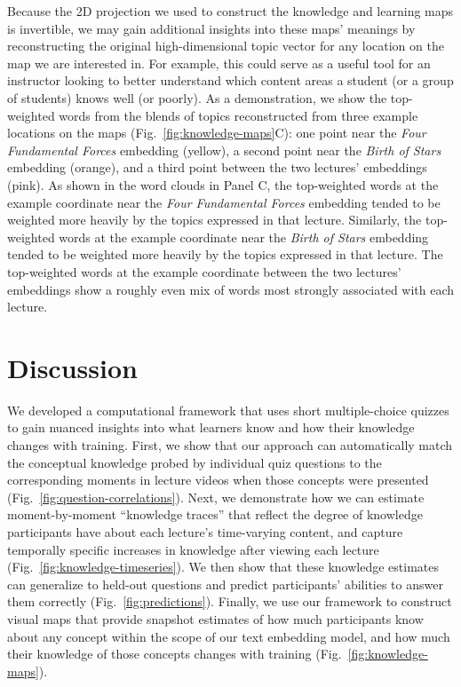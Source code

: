 \documentclass[10pt]{article}
\begin{document}
Because the 2D projection we used to construct the knowledge and learning maps
is invertible, we may gain additional insights into these maps' meanings by
reconstructing the original high-dimensional topic vector for any location on
the map we are interested in. For example, this could serve as a useful tool
for an instructor looking to better understand which content areas a student
(or a group of students) knows well (or poorly). As a demonstration, we show
the top-weighted words from the blends of topics reconstructed from three
example locations on the maps (Fig.~\ref{fig:knowledge-maps}C): one point near
the \textit{Four Fundamental Forces} embedding (yellow), a second point near
the \textit{Birth of Stars} embedding (orange), and a third point between the
two lectures' embeddings (pink). As shown in the word clouds in Panel C, the
top-weighted words at the example coordinate near the \textit{Four Fundamental
Forces} embedding tended to be weighted more heavily by the topics expressed in
that lecture. Similarly, the top-weighted words at the example coordinate near
the \textit{Birth of Stars} embedding tended to be weighted more heavily by the
topics expressed in that lecture. The top-weighted words at the
example coordinate between the two lectures' embeddings show a roughly even mix
of words most strongly associated with each lecture.

\section*{Discussion}

We developed a computational framework that uses short multiple-choice quizzes
to gain nuanced insights into what learners know and how their knowledge
changes with training. First, we show that our approach can automatically match
the conceptual knowledge probed by individual quiz questions to the
corresponding moments in lecture videos when those concepts were presented
(Fig.~\ref{fig:question-correlations}). Next, we demonstrate how we can
estimate moment-by-moment ``knowledge traces'' that reflect the degree of
knowledge participants have about each lecture's time-varying content, and
capture temporally specific increases in knowledge after viewing each lecture
(Fig.~\ref{fig:knowledge-timeseries}). We then show that these knowledge
estimates can generalize to held-out questions and predict participants'
abilities to answer them correctly (Fig.~\ref{fig:predictions}). Finally, we use
our framework to construct visual maps that provide snapshot estimates of how
much participants know about any concept within the scope of our text embedding
model, and how much their knowledge of those concepts changes with training
(Fig.~\ref{fig:knowledge-maps}).
\end{document}

